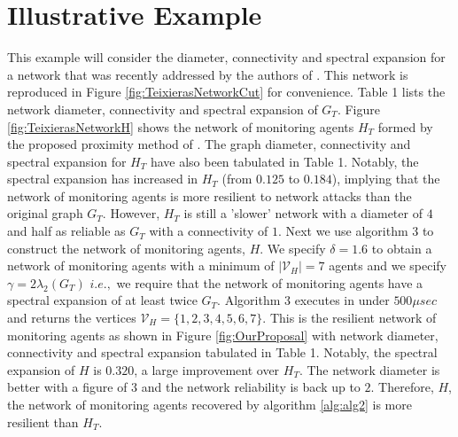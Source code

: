 \documentclass[reqno,8pt]{amsart}
\theoremstyle{definition}
\theoremstyle{remark}
\numberwithin{equation}{section}
\def\cV{\mathcal{V}}
\newcommand{\ie}{\textit{i}.\textit{e}., }
\begin{document}
\section{Illustrative Example} \label{sec:Example}
This example will consider the diameter, connectivity and spectral expansion for a network that was recently addressed by the authors of \cite{teixeira_distributed_2014}. This network is reproduced in Figure \ref{fig:TeixierasNetworkCut} for convenience. Table 1 lists the network diameter, connectivity and spectral expansion of $G_T$. Figure \ref{fig:TeixierasNetworkH} shows the network of monitoring agents $H_T$ formed by the proposed proximity method of \cite{teixeira_distributed_2014}. The graph diameter, connectivity and spectral expansion for $H_T$ have also been tabulated in Table 1. Notably, the spectral expansion has increased in $H_T$ (from $0.125$ to $0.184$), implying that the network of monitoring agents is more resilient to network attacks than the original graph $G_T$. However, $H_T$ is still a 'slower' network with a diameter of $4$ and half as reliable as $G_T$ with a connectivity of $1$. Next we use algorithm 3 to construct the network of monitoring agents, $H$. We specify $\delta = 1.6$ to obtain a network of monitoring agents with a minimum of $|\cV_H|=7$ agents and we specify $\gamma = 2\lambda_2 (G_T)$ $\ie$ we require that the network of monitoring agents have a spectral expansion of at least twice $G_T$. Algorithm 3 executes in under $500 \mu sec$ and returns the vertices $\cV_H = \{1,2,3,4,5,6,7\}$. This is the resilient network of monitoring agents as shown in Figure \ref{fig:OurProposal} with network diameter, connectivity and spectral expansion tabulated in Table 1. Notably, the spectral expansion of $H$ is $0.320$, a large improvement over $H_T$. The network diameter is better with a figure of $3$ and the network reliability is back up to $2$. Therefore, $H$, the network of monitoring agents recovered by algorithm \ref{alg:alg2} is more resilient than $H_T$. 
\end{document}
